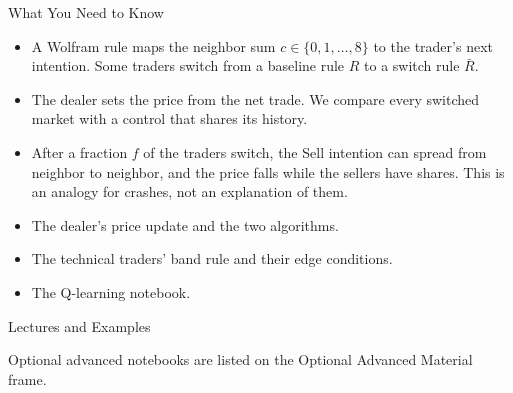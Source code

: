 \documentclass[aspectratio=169,11pt]{beamer}
\newcommand{\repo}{https://github.com/varnerlab/CHEME-5660-CourseRepository-Fall-2026/blob/main/lectures/week-12/L12b}
\begin{document}
\begin{frame}{What You Need to Know}
  \vspace{0.3em}
  {\large\textbf{}}
  \begin{itemize}\setlength{\itemsep}{0.4em}
    \item A Wolfram rule maps the neighbor sum $c\in\{0,1,\dots,8\}$ to the
      trader's next intention. Some traders switch from a baseline rule
      $R$ to a switch rule $\bar{R}$.
    \item The dealer sets the price from the net trade. We compare every switched
      market with a control that shares its history.
    \item After a fraction $f$ of the traders switch, the Sell intention can spread
      from neighbor to neighbor, and the price falls while the sellers have
      shares. This is an analogy for crashes, not an explanation of them.
  \end{itemize}

  \vspace{0.5em}
  {\large\textbf{} }
  \begin{itemize}\setlength{\itemsep}{0.3em}
    \item The dealer's price update and the two algorithms.
    \item The technical traders' band rule and their edge conditions.
    \item The Q-learning notebook.
  \end{itemize}
\end{frame}

\begin{frame}{Lectures and Examples}
  \vspace{0.3em}
  {\normalsize\textbf{}\par\small
  \href{\repo/CHEME-5660-L12b-Lecture-WhyDoMarketsCrash-ABM-Fall-2026.ipynb}{}}

  \vspace{0.6em}
  {\normalsize\textbf{}\par\small
  \href{\repo/CHEME-5660-L12b-Example-Wolfram-Rules-Fall-2026.ipynb}{}\par
  \href{\repo/CHEME-5660-L12b-Example-Wolfram-RuleSwitch-Fall-2026.ipynb}{}}

  \vspace{0.6em}
  {\normalsize\textbf{}\par\small
  \href{\repo/CHEME-5660-L12b-Example-Wolfram-StylizedFacts-Fall-2026.ipynb}{}\par
  \href{\repo/CHEME-5660-L12b-Example-Wolfram-Viewport-Fall-2026.ipynb}{}}

  \vspace{0.6em}
  Optional advanced notebooks are listed on the Optional Advanced Material frame.
\end{frame}
\end{document}
